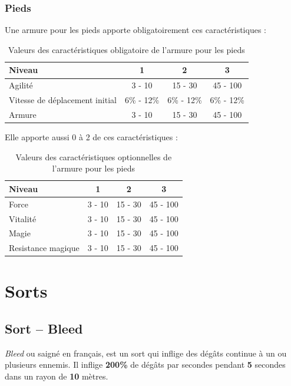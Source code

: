\documentclass[11pt, a4paper, oneside]{report}
\begin{document}
\subsubsection{Pieds}
Une armure pour les pieds apporte obligatoirement ces caractéristiques :
\begin{table}[H]
\begin{center}
\begin{tabular}{| l | c | c | c |}
  \hline      
  Niveau 				& 1 & 2 & 3\\ \hline \hline
  Agilité 				& 3 - 10 & 15 - 30 & 45 - 100\\ \hline
  Vitesse de déplacement initial& 6\% - 12\% & 6\% - 12\% & 6\% - 12\%\\ \hline
  Armure 				& 3 - 10 & 15 - 30 & 45 - 100\\ \hline
\end{tabular}
\caption{Valeurs des caractéristiques obligatoire de l'armure pour les pieds}
\end{center}
\end{table}
Elle apporte aussi 0 à 2 de ces caractéristiques :
\begin{table}[H]
\begin{center}
\begin{tabular}{| l | c | c | c |}
  \hline      
  Niveau 				& 1 & 2 & 3\\ \hline \hline                 
  Force 				& 3 - 10 & 15 - 30 & 45 - 100\\ \hline
  Vitalité 				& 3 - 10 & 15 - 30 & 45 - 100\\ \hline
  Magie 				& 3 - 10 & 15 - 30 & 45 - 100\\ \hline
  Resistance magique 	& 3 - 10 & 15 - 30 & 45 - 100\\ \hline
\end{tabular}
\caption{Valeurs des caractéristiques optionnelles de l'armure pour les pieds}
\end{center}
\end{table}
\section{Sorts}
\subsection{Sort -- Bleed}
\emph{Bleed} ou saigné en français, est un sort qui inflige des dégâts continue à un ou plusieurs ennemis. Il inflige \textbf{200\%} de dégâts par secondes pendant \textbf{5} secondes dans un rayon de \textbf{10} mètres.
\end{document}
